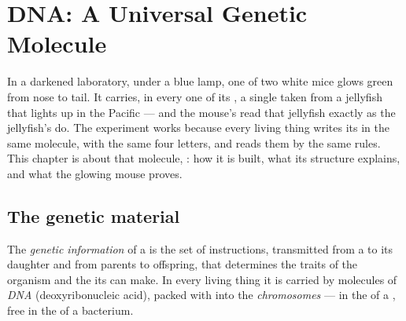 \chapter{DNA: A Universal Genetic Molecule}\label{ch:g10:universal-dna}

In a darkened laboratory, under a blue lamp, one of two white mice glows
green from nose to tail. It carries, in every one of its , a single
 taken from a jellyfish that lights up in the Pacific --- and the
mouse's  read that jellyfish  exactly as the jellyfish's 
do. The experiment works because every living thing writes its  in
the same molecule, with the same four letters, and reads them by the
same rules. This chapter is about that molecule, : how it is built,
what its structure explains, and what the glowing mouse proves.

\section{The genetic material}

\begin{definition}\label{def:g10:universal-dna:information}
The \emph{genetic information} of a  is
the set of instructions, transmitted from a  to its daughter 
and from parents to offspring, that determines the traits of the
organism and the  its  can make. In every living thing it
is carried by molecules of \emph{DNA} (deoxyribonucleic
acid), packed with  into the \emph{chromosomes}
--- in the  of a , free in the  of a
bacterium.
\end{definition}

